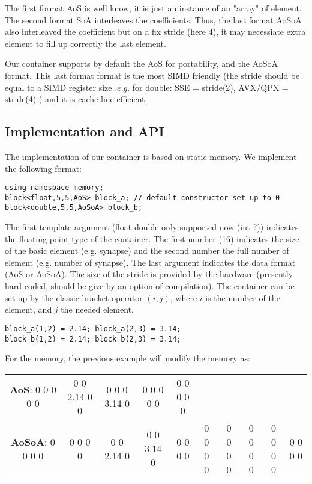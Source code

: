 \documentclass[11pt]{amsart}
\begin{document}
The first format AoS is well know, it is just an instance of an  "array" of element. The second format SoA interleaves the coefficients. Thus, the last format AoSoA also interleaved the coefficient but on a fix stride (here 4), it may necessiate extra element 
to fill up correctly the last element.

Our container supports by  default the AoS for portability, and the AoSoA format. This last format format is the most SIMD friendly (the stride should be equal to a SIMD register size  $.e.g.$  for double: SSE = stride(2), AVX/QPX = stride(4)  )
 and it is cache line efficient.
\subsection*{Implementation and API}

The implementation of our container is based on static memory. We implement the following format:
\\
\begin{lstlisting}
using namespace memory;
block<float,5,5,AoS> block_a; // default constructor set up to 0
block<double,5,5,AoSoA> block_b;
\end{lstlisting}
The first template argument (float-double only supported now (int ?)) indicates the floating point type of the container. The first number (16) indicates the size of the basic element (e.g. synapse) and the second number the full number
of element (e.g. number of synapse). The last argument indicates the data format (AoS or AoSoA). The size of the stride is provided by the hardware (presently hard coded, should be give by an option of compilation).  The container can be set up by the classic bracket operator $(i,j)$, where $i$ is the number of the element, and $j$ the needed element.
\\
\begin{lstlisting}
block_a(1,2) = 2.14; block_a(2,3) = 3.14;
block_b(1,2) = 2.14; block_b(2,3) = 3.14;
\end{lstlisting}
For the memory, the previous example will modify the memory as:

\vspace{0.2cm}
\begin{center}
\tiny{
\begin{tabular}{ c  c  c  c  c c c c c c}
 \textbf{AoS}:  0 0 0 0 0 &  0 0 2.14 0 0 & 0 0 0 3.14 0 & 0 0 0 0 0 & 0 0 0 0 0 &&&&& \\

 \textbf{AoSoA}:  0 0 0 0 & 0 0 0 0 & 0 0 2.14 0 & 0 0 3.14 0 & 0 0 0 0 & 0 0 0 0 & 0 0 0 0 & 0 0 0 0 & 0 0 0 0 & 0 0 0 0\\
\end{tabular}}
\end{center}
\vspace{0.2cm}
\end{document}
